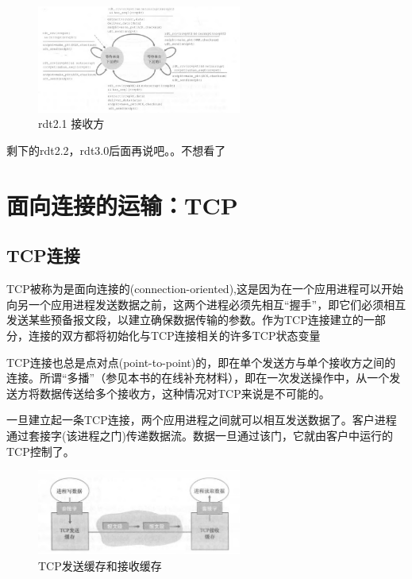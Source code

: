 \begin{figure}[!htbp]
    \centering
    \includegraphics[width=0.6\textwidth]{image/chapter03/rdt2.1接收方.png}
    \caption{rdt2.1 接收方}
\end{figure}

    剩下的rdt2.2，rdt3.0后面再说吧。。不想看了

\section{面向连接的运输：TCP}

\subsection{TCP连接}

    TCP被称为是面向连接的(connection-oriented),这是因为在一个应用进程可以开始向另一个应用进程发送数据之前，这两个进程必须先相互“握手”，即它们必须相互发送某些预备报文段，以建立确保数据传输的参数。作为TCP连接建立的一部分，连接的双方都将初始化与TCP连接相关的许多TCP状态变量

    TCP连接也总是点对点(point-to-point)的，即在单个发送方与单个接收方之间的连接。所谓“多播”（参见本书的在线补充材料），即在一次发送操作中，从一个发送方将数据传送给多个接收方，这种情况对TCP来说是不可能的。

    一旦建立起一条TCP连接，两个应用进程之间就可以相互发送数据了。客户进程通过套接字(该进程之门)传递数据流。数据一旦通过该门，它就由客户中运行的TCP控制了。

\begin{figure}[!htbp]
    \centering
    \includegraphics[width=0.6\textwidth]{image/chapter03/TCP发送缓存和接收缓存.png}
    \caption{TCP发送缓存和接收缓存}
\end{figure}

